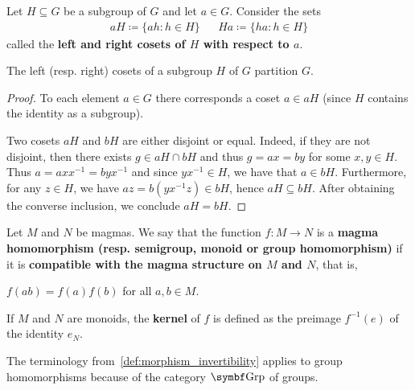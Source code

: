 \begin{definition}\label{def:group_cosets}
  Let \( H \subseteq G \) be a subgroup of \( G \) and let \( a \in G \). Consider the sets
  \begin{align*}
    aH \coloneqq \{ ah \colon h \in H \}
    &&
    Ha \coloneqq \{ ha \colon h \in H \}
  \end{align*}
  called the \textbf{left and right cosets of \( H \) with respect to \( a \)}.
\end{definition}

\begin{proposition}\label{thm:coset_partition}
  The left (resp. right) cosets of a subgroup \( H \) of \( G \) partition \( G \).
\end{proposition}
\begin{proof}
  To each element \( a \in G \) there corresponds a coset \( a \in aH \) (since \( H \) contains the identity as a subgroup).

  Two cosets \( aH \) and \( bH \) are either disjoint or equal. Indeed, if they are not disjoint, then there exists \( g \in aH \cap bH \) and thus \( g = ax = by \) for some \( x, y \in H \). Thus \( a = a x x^{-1} = b y x^{-1} \) and since \( y x^{-1} \in H \), we have that \( a \in bH \). Furthermore, for any \( z \in H \), we have \( az = b(y x^{-1} z) \in bH \), hence \( aH \subseteq bH \). After obtaining the converse inclusion, we conclude \( aH = bH \).
\end{proof}

\begin{definition}\label{def:group_homomorphism}
  Let \( M \) and \( N \) be magmas. We say that the function \( f: M \to N \) is a \textbf{magma homomorphism (resp. semigroup, monoid or group homomorphism)} if it is \textbf{compatible with the magma structure on \( M \) and \( N \)}, that is,
  \begin{description}
     \( f(ab) = f(a) f(b) \) for all \( a, b \in M \).
  \end{description}

  If \( M \) and \( N \) are monoids, the \textbf{kernel} of \( f \) is defined as the preimage \( f^{-1}(e) \) of the identity \( e_N \).

  The terminology from~\cref{def:morphism_invertibility} applies to group homomorphisms because of the category \( \Bold{Grp} \) of groups.
\end{definition}

